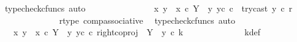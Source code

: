 \begin{isabellebody}
\ {\isacharparenleft}{\kern0pt}typecheck{\isacharunderscore}{\kern0pt}cfuncs{\isacharcomma}{\kern0pt}\ auto{\isacharparenright}{\kern0pt}\isanewline
\ \ \ \ \ \ \ \ \ \ \isamarkupfalse%
\ \isamarkupfalse%
\ {\isachardoublequoteopen}{\isachardot}{\kern0pt}{\isachardot}{\kern0pt}{\isachardot}{\kern0pt}\ {\isacharequal}{\kern0pt}\ {\isacharparenleft}{\kern0pt}{\isasymlangle}x{}{\isacharcomma}{\kern0pt}\ y{}{\isasymrangle}\ {\isasymamalg}\ {\isasymlangle}x{}\ {\isasymcirc}\isactrlsub c\ {\isasymbeta}\isactrlbsub Y\ {\isasymsetminus}\ {\isacharparenleft}{\kern0pt}{\isasymone}{\isacharcomma}{\kern0pt}y{}{\isacharparenright}{\kern0pt}\isactrlesub {\isacharcomma}{\kern0pt}\ y{}\isactrlsup c{\isasymrangle}{\isacharparenright}{\kern0pt}\ {\isasymcirc}\isactrlsub c\ \ {\isacharparenleft}{\kern0pt}try{\isacharunderscore}{\kern0pt}cast\ y{}\ {\isasymcirc}\isactrlsub c\ r{\isacharparenright}{\kern0pt}{\isachardoublequoteclose}\isanewline
\ \ \ \ \ \ \ \ \ \ \ \ \isamarkupfalse%
\ r{\isacharunderscore}{\kern0pt}type\ comp{\isacharunderscore}{\kern0pt}associative{}\ \isamarkupfalse%
\ {\isacharparenleft}{\kern0pt}typecheck{\isacharunderscore}{\kern0pt}cfuncs{\isacharcomma}{\kern0pt}\ auto{\isacharparenright}{\kern0pt}\isanewline
\ \ \ \ \ \ \ \ \ \ \isamarkupfalse%
\ \isamarkupfalse%
\ {\isachardoublequoteopen}{\isachardot}{\kern0pt}{\isachardot}{\kern0pt}{\isachardot}{\kern0pt}\ {\isacharequal}{\kern0pt}\ {\isacharparenleft}{\kern0pt}{\isasymlangle}x{}{\isacharcomma}{\kern0pt}\ y{}{\isasymrangle}\ {\isasymamalg}\ {\isasymlangle}x{}\ {\isasymcirc}\isactrlsub c\ {\isasymbeta}\isactrlbsub Y\ {\isasymsetminus}\ {\isacharparenleft}{\kern0pt}{\isasymone}{\isacharcomma}{\kern0pt}y{}{\isacharparenright}{\kern0pt}\isactrlesub {\isacharcomma}{\kern0pt}\ y{}\isactrlsup c{\isasymrangle}{\isacharparenright}{\kern0pt}\ {\isasymcirc}\isactrlsub c\ {\isacharparenleft}{\kern0pt}right{\isacharunderscore}{\kern0pt}coproj\ {\isasymone}\ {\isacharparenleft}{\kern0pt}Y\ {\isasymsetminus}\ {\isacharparenleft}{\kern0pt}{\isasymone}{\isacharcomma}{\kern0pt}y{}{\isacharparenright}{\kern0pt}{\isacharparenright}{\kern0pt}\ {\isasymcirc}\isactrlsub c\ k{\isacharparenright}{\kern0pt}{\isachardoublequoteclose}\isanewline
\ \ \ \ \ \ \ \ \ \ \ \ \isamarkupfalse%
\ k{\isacharunderscore}{\kern0pt}def\ \isamarkupfalse%

\end{isabellebody}
